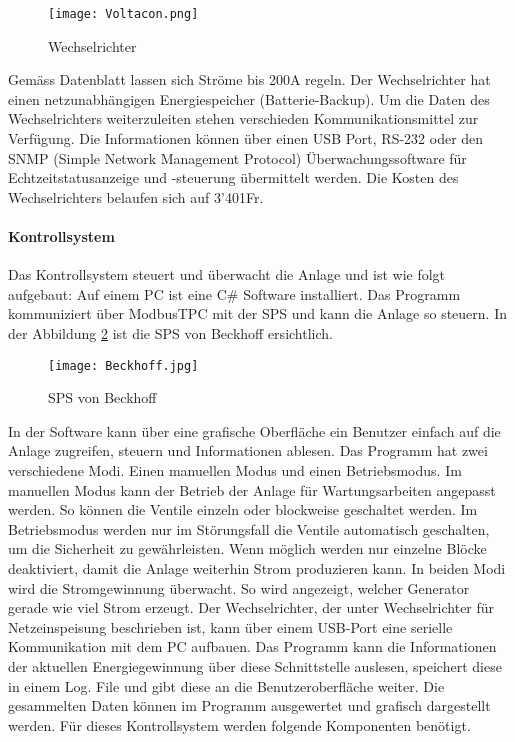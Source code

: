 \begin{figure} [H]
	\centering
	\texttt{[image: Voltacon.png]}
	\caption{Wechselrichter \cite{Voltaconsolar}}
	\label{fig:Wechselrichter}
\end{figure}

Gemäss Datenblatt lassen sich Ströme bis 200A regeln. Der Wechselrichter hat einen netzunabhängigen Energiespeicher (Batterie-Backup). Um die Daten des Wechselrichters weiterzuleiten stehen verschieden Kommunikationsmittel zur Verfügung. Die Informationen können über einen USB Port, RS-232 oder den SNMP (Simple Network Management Protocol) Überwachungssoftware für Echtzeitstatusanzeige und -steuerung übermittelt werden. Die Kosten des Wechselrichters belaufen sich auf 3'401\si{Fr}.

\newpage


\paragraph{Kontrollsystem}

Das Kontrollsystem steuert und überwacht die Anlage und ist wie folgt aufgebaut: Auf einem PC ist eine C\# Software installiert. Das Programm kommuniziert über ModbusTPC mit der SPS und kann die Anlage so steuern. In der Abbildung \ref{fig:beckhoff}  ist die SPS von Beckhoff ersichtlich.

\bigskip

\begin{figure} [H]
	\centering
	\texttt{[image: Beckhoff.jpg]}
	\caption{SPS von Beckhoff \cite{beckhoff}}
	\label{fig:beckhoff}
\end{figure}

In der Software kann über eine grafische Oberfläche ein Benutzer einfach auf die Anlage zugreifen, steuern und Informationen ablesen. Das Programm hat zwei verschiedene Modi. Einen manuellen Modus und einen Betriebsmodus. Im manuellen Modus kann der Betrieb der Anlage für Wartungsarbeiten angepasst werden. So können die Ventile einzeln oder blockweise geschaltet werden. Im Betriebsmodus werden nur im Störungsfall die Ventile automatisch geschalten, um die Sicherheit zu gewährleisten. Wenn möglich werden nur einzelne Blöcke deaktiviert, damit die Anlage weiterhin Strom produzieren kann. In beiden Modi wird die Stromgewinnung überwacht. So wird angezeigt, welcher Generator gerade wie viel Strom erzeugt. Der Wechselrichter, der unter Wechselrichter für Netzeinspeisung beschrieben ist, kann über einem USB-Port eine serielle Kommunikation mit dem PC aufbauen. Das Programm kann die Informationen der aktuellen Energiegewinnung über diese Schnittstelle auslesen, speichert diese in einem Log. File und gibt diese an die Benutzeroberfläche weiter. Die gesammelten Daten können im Programm ausgewertet und grafisch dargestellt werden. Für dieses Kontrollsystem werden folgende Komponenten benötigt.

